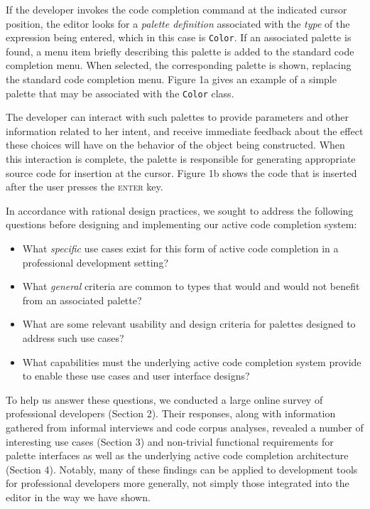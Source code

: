 \documentclass[10pt, conference, compsocconf]{IEEEtran}
\begin{document}
If the developer invokes the code completion command at the indicated cursor position, the editor  looks  for a {\it palette definition} associated with the {\it type} of the expression being entered, which in this case is  \verb|Color|. If an associated palette is found, a menu item briefly describing this palette is added to the standard code completion menu. When selected, the corresponding palette is shown, replacing the standard code completion menu. Figure 1a gives an example of a simple palette that may be associated with the \verb|Color| class. 

The developer can interact with such palettes to provide parameters and other information related to her intent, and receive immediate feedback about the effect these choices will have on the behavior of the object being constructed. When this interaction is complete, the palette is responsible for generating appropriate source code for insertion at the cursor. Figure 1b shows the code that is inserted after the user presses the \textsc{enter} key.

In accordance with rational design practices, we sought to address the following questions before designing and implementing our active code completion system:

\begin{itemize}
\item What {\it specific} use cases exist for this form of active code completion in a professional development setting? 
\item What {\it general} criteria are common to types that would and would not benefit from an associated palette?
\item What are some relevant usability and design criteria for palettes designed to address such use cases?
\item What capabilities must the underlying active code completion system provide to enable these use cases and user interface designs?
\end{itemize}

To help us answer these questions, we conducted a large online survey of professional developers (Section 2). Their responses, along with information gathered from informal interviews and code corpus analyses, revealed a number of interesting use cases (Section 3) and non-trivial functional requirements for palette interfaces as well as the underlying active code completion architecture (Section 4). Notably, many of these findings can be applied to development tools for professional developers more generally, not simply those integrated into the editor in the way we have shown.
\end{document}
